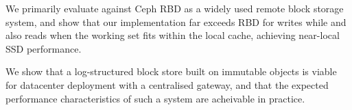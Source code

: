 We primarily evaluate against Ceph RBD as a widely used remote block storage
system, and show that our implementation far exceeds RBD for writes while
and also reads when the working set fits within the local cache, achieving
near-local SSD performance.

We show that a log-structured block store built on immutable objects is viable
for datacenter deployment with a centralised gateway, and that the expected
performance characteristics of such a system are acheivable in practice.

